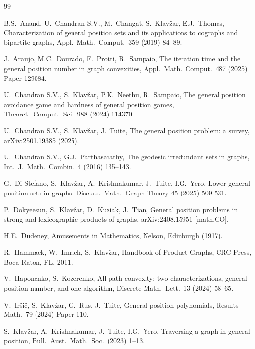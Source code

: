 \documentclass[12pt]{article}
\begin{document}
\begin{thebibliography}{99}

B.S.~Anand, U.~Chandran S.V., M.~Changat, S.~Klav\v{z}ar, E.J.~Thomas,
Characterization of general position sets and its applications to cographs and bipartite graphs,
Appl.\ Math.\ Comput.\ 359 (2019) 84--89.

J.~Araujo, M.C.~Dourado, F.~Protti, R.~Sampaio, The iteration time and the general position number in graph convexities, 
Appl.\ Math.\ Comput.\ 487 (2025) Paper 129084. 

U.~Chandran S.V., S.~Klav\v{z}ar, P.K.~Neethu, R.~Sampaio,
The general position avoidance game and hardness of general position games,
Theoret.\ Comput.\ Sci.\ 988 (2024) 114370.

 U.~Chandran S.V., S.~Klav\v{z}ar, J.~Tuite, The general position problem: a survey, arXiv:2501.19385 (2025).

U.~Chandran S.V., G.J.~Parthasarathy,
The geodesic irredundant sets in graphs,
Int.\ J.\ Math.\ Combin.\  4 (2016) 135--143.

G.~{Di Stefano}, S.~Klav\v{z}ar, A.~Krishnakumar, J.~Tuite, I.G.~Yero,
Lower general position sets in graphs,
Discuss.\ Math.\ Graph Theory 45 (2025) 509-531.

P.~Dokyeesun, S.~Klav\v zar, D.~Kuziak, J.~Tian,
General position problems in strong and lexicographic products of graphs,
arXiv:2408.15951 [math.CO].

H.E.~Dudeney,
Amusements in Mathematics,
Nelson, Edinburgh (1917).

R.~Hammack, W.~Imrich, S.~Klav\v{z}ar,
Handbook of {P}roduct {G}raphs,
CRC Press, Boca Raton, FL, 2011.

V.~Haponenko, S.~Kozerenko, 
All-path convexity: two characterizations, general position number, and one algorithm,
Discrete Math.\ Lett.\ 13 (2024) 58--65. 

V.~Ir\v si\v c, S.~Klav\v zar, G.~Rus, J.~Tuite, 
General position polynomials,
Results Math.\ 79 (2024) Paper 110.

S.~Klav\v zar, A.~Krishnakumar, J.~Tuite, I.G.~Yero, 
Traversing a graph in general position, 
Bull.\ Aust.\ Math.\ Soc.\ (2023) 1--13.        


\end{thebibliography}
\end{document}
